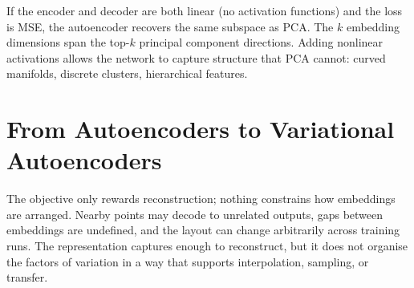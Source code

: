     If the encoder and decoder are both linear (no activation functions) and the loss is MSE, the autoencoder recovers the same subspace as PCA\cite{Baldi1989}.
    The $k$ embedding dimensions span the top-$k$ principal component directions.
    Adding nonlinear activations allows the network to capture structure that PCA cannot: curved manifolds, discrete clusters, hierarchical features.

\newpage

\section{From Autoencoders to Variational Autoencoders} 


The objective only rewards reconstruction; nothing constrains how embeddings are arranged.
Nearby points may decode to unrelated outputs, gaps between embeddings are undefined, and the layout can change arbitrarily across training runs.
The representation captures enough to reconstruct, but it does not organise the factors of variation in a way that supports interpolation, sampling, or transfer.



